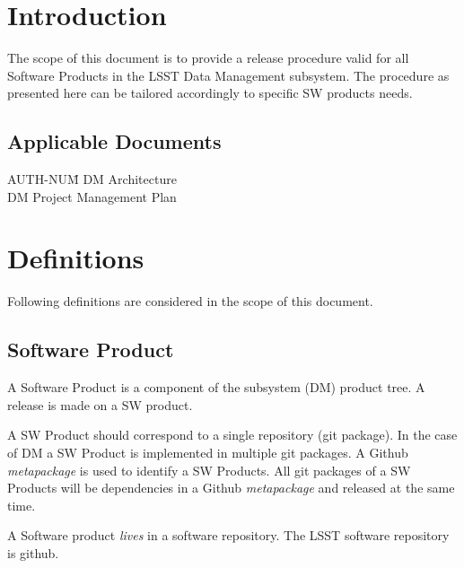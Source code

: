 \section{Introduction} \label{sec:intro}

The scope of this document is to provide a release procedure valid for all Software Products in the LSST Data Management subsystem. The procedure as presented here can be tailored accordingly to specific SW products needs.

\subsection{Applicable Documents}

\begin{tabbing}
AUTH-NUM\= \kill
{} \>     DM Architecture\\
 \>     DM Project Management Plan   \\
\end{tabbing}


\newpage
\section{Definitions} \label{sec:definitions}

Following definitions are considered in the scope of this document.


\subsection{Software Product} \label{sect:swprod}

A Software Product is a component of the subsystem (DM) product tree.
A release is made on a SW product.

A SW Product should correspond to a single repository (git package).
In the case of DM a SW Product is implemented in multiple git packages.
A Github \textit{metapackage} is used to identify a SW Products.
All git packages of a SW Products will be dependencies in a Github \textit{metapackage} and released at the same time.

A Software product \textit{lives} in a software repository. The LSST software repository is github.

